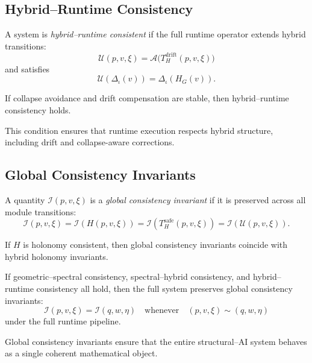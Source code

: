 \documentclass[11pt]{article}
\begin{document}
\subsection{Hybrid--Runtime Consistency}

\begin{definition}
A system is \emph{hybrid--runtime consistent} if the full runtime operator
extends hybrid transitions:
\[
\mathcal{U}(p,v,\xi)
= \mathcal{A}\big( T_H^\mathrm{drift}(p,v,\xi) \big)
\]
and satisfies
\[
\mathcal{U}(\Delta_\iota(v))
= \Delta_\iota(H_G(v)).
\]
\end{definition}

\begin{lemma}
If collapse avoidance and drift compensation are stable, then hybrid--runtime
consistency holds.
\end{lemma}

\begin{remark}
This condition ensures that runtime execution respects hybrid structure,
including drift and collapse-aware corrections.
\end{remark}

\subsection{Global Consistency Invariants}

\begin{definition}
A quantity $\mathcal{I}(p,v,\xi)$ is a \emph{global consistency invariant}
if it is preserved across all module transitions:
\[
\mathcal{I}(p,v,\xi)
= \mathcal{I}(H(p,v,\xi))
= \mathcal{I}(T_H^\mathrm{safe}(p,v,\xi))
= \mathcal{I}(\mathcal{U}(p,v,\xi)).
\]
\end{definition}

\begin{lemma}
If $H$ is holonomy consistent, then global consistency invariants coincide
with hybrid holonomy invariants.
\end{lemma}

\begin{theorem}
If geometric--spectral consistency, spectral--hybrid consistency, and
hybrid--runtime consistency all hold, then the full system preserves
global consistency invariants:
\[
\mathcal{I}(p,v,\xi)
= \mathcal{I}(q,w,\eta)
\quad\text{whenever}\quad
(p,v,\xi) \sim (q,w,\eta)
\]
under the full runtime pipeline.
\end{theorem}

\begin{remark}
Global consistency invariants ensure that the entire structural--AI system
behaves as a single coherent mathematical object.
\end{remark}
\end{document}
